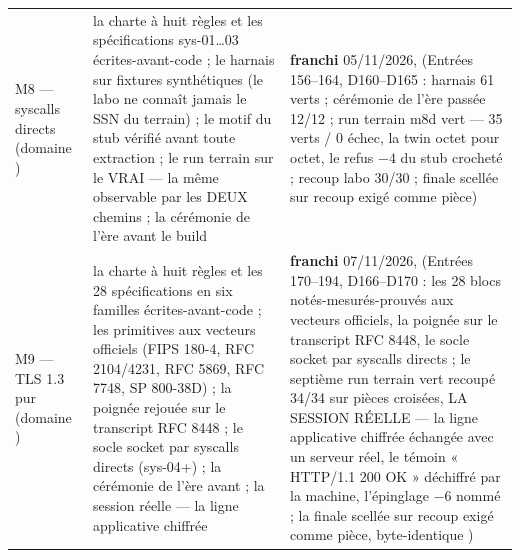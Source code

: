 \begin{table}[htbp]
\begin{tabularx}{\textwidth}{@{}l Y >{\raggedright\arraybackslash}p{2.6cm}@{}}
M8 — syscalls directs (domaine ) & la charte à huit règles et les spécifications sys-01…03 écrites-avant-code ; le harnais sur fixtures  synthétiques (le labo ne connaît jamais le SSN du terrain) ; le motif du stub vérifié avant toute extraction ; le run terrain sur le VRAI  — la même observable par les DEUX chemins ; la cérémonie de l'ère avant le build & \textbf{franchi} 05/11/2026,  (Entrées 156--164, D160--D165 : harnais 61 verts ; cérémonie de l'ère passée 12/12 ; run terrain m8d vert — 35 verts / 0 échec, la twin octet pour octet, le refus $-4$ du stub crocheté ; recoup labo 30/30 ; finale scellée sur recoup exigé comme pièce) \\
M9 — TLS 1.3 pur (domaine ) & la charte à huit règles et les 28 spécifications en six familles écrites-avant-code ; les primitives aux vecteurs officiels (FIPS 180-4, RFC 2104/4231, RFC 5869, RFC 7748, SP 800-38D) ; la poignée rejouée sur le transcript RFC 8448 ; le socle socket par syscalls directs (sys-04+) ; la cérémonie de l'ère avant  ; la session réelle — la ligne applicative chiffrée & \textbf{franchi} 07/11/2026,  (Entrées 170--194, D166--D170 : les 28 blocs notés-mesurés-prouvés aux vecteurs officiels, la poignée sur le transcript RFC 8448, le socle socket par syscalls directs ; le septième run terrain vert recoupé 34/34 sur pièces croisées, LA SESSION RÉELLE — la ligne applicative chiffrée échangée avec un serveur réel, le témoin « HTTP/1.1 200 OK » déchiffré par la machine, l'épinglage $-6$ nommé ; la finale scellée sur recoup exigé comme pièce,  byte-identique ) \\

\end{tabularx}
\end{table}
